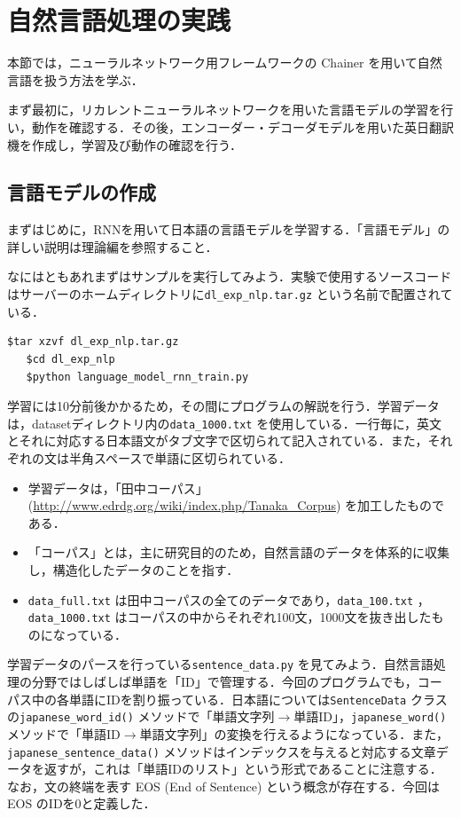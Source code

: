  \section{自然言語処理の実践}

 本節では，ニューラルネットワーク用フレームワークの Chainer を用いて自然言語を扱う方法を学ぶ．

 まず最初に，リカレントニューラルネットワークを用いた言語モデルの学習を行い，動作を確認する．その後，エンコーダー・デコーダモデルを用いた英日翻訳機を作成し，学習及び動作の確認を行う．

  \subsection{言語モデルの作成}
 まずはじめに，RNNを用いて日本語の言語モデルを学習する．「言語モデル」の詳しい説明は理論編を参照すること．

 なにはともあれまずはサンプルを実行してみよう．実験で使用するソースコードはサーバーのホームディレクトリに\verb+dl_exp_nlp.tar.gz+ という名前で配置されている．
  \begin{lstlisting}[basicstyle=\ttfamily\footnotesize, frame=single]
   $tar xzvf dl_exp_nlp.tar.gz
   $cd dl_exp_nlp
   $python language_model_rnn_train.py
  \end{lstlisting}
学習には10分前後かかるため，その間にプログラムの解説を行う．学習データは，datasetディレクトリ内の\verb+data_1000.txt+ を使用している．一行毎に，英文とそれに対応する日本語文がタブ文字で区切られて記入されている．また，それぞれの文は半角スペースで単語に区切られている．
\begin{itemize}
\item 学習データは，「田中コーパス」 (\url{http://www.edrdg.org/wiki/index.php/Tanaka_Corpus}) を加工したものである．
\item 「コーパス」とは，主に研究目的のため，自然言語のデータを体系的に収集し，構造化したデータのことを指す．
\item \verb+data_full.txt+ は田中コーパスの全てのデータであり，\verb+data_100.txt+ ，\verb+data_1000.txt+ はコーパスの中からそれぞれ100文，1000文を抜き出したものになっている．
\end{itemize}
学習データのパースを行っている\verb+sentence_data.py+ を見てみよう．自然言語処理の分野ではしばしば単語を「ID」で管理する．今回のプログラムでも，コーパス中の各単語にIDを割り振っている．日本語については\verb+SentenceData+ クラスの\verb+japanese_word_id()+ メソッドで「単語文字列$\rightarrow$単語ID」，\verb+japanese_word()+ メソッドで「単語ID$\rightarrow$単語文字列」の変換を行えるようになっている．また，\verb+japanese_sentence_data()+ メソッドはインデックスを与えると対応する文章データを返すが，これは「単語IDのリスト」という形式であることに注意する．なお，文の終端を表す EOS (End of Sentence) という概念が存在する．今回は EOS のIDを0と定義した．

